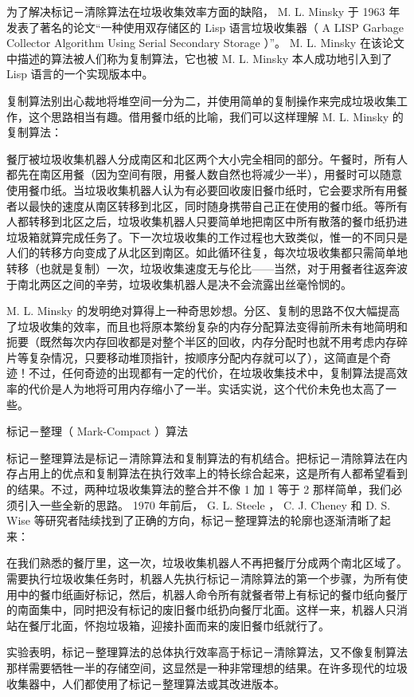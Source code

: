 \documentclass[a4paper, 11pt]{article}
\begin{document}
为了解决标记－清除算法在垃圾收集效率方面的缺陷， M. L. Minsky 于 1963 年发表了著名的论文“一种使用双存储区的 Lisp 语言垃圾收集器（ A LISP Garbage Collector Algorithm Using Serial Secondary Storage ）”。 M. L. Minsky 在该论文中描述的算法被人们称为复制算法，它也被 M. L. Minsky 本人成功地引入到了 Lisp 语言的一个实现版本中。

复制算法别出心裁地将堆空间一分为二，并使用简单的复制操作来完成垃圾收集工作，这个思路相当有趣。借用餐巾纸的比喻，我们可以这样理解 M. L. Minsky 的复制算法：

餐厅被垃圾收集机器人分成南区和北区两个大小完全相同的部分。午餐时，所有人都先在南区用餐（因为空间有限，用餐人数自然也将减少一半），用餐时可以随意使用餐巾纸。当垃圾收集机器人认为有必要回收废旧餐巾纸时，它会要求所有用餐者以最快的速度从南区转移到北区，同时随身携带自己正在使用的餐巾纸。等所有人都转移到北区之后，垃圾收集机器人只要简单地把南区中所有散落的餐巾纸扔进垃圾箱就算完成任务了。下一次垃圾收集的工作过程也大致类似，惟一的不同只是人们的转移方向变成了从北区到南区。如此循环往复，每次垃圾收集都只需简单地转移（也就是复制）一次，垃圾收集速度无与伦比——当然，对于用餐者往返奔波于南北两区之间的辛劳，垃圾收集机器人是决不会流露出丝毫怜悯的。

M. L. Minsky 的发明绝对算得上一种奇思妙想。分区、复制的思路不仅大幅提高了垃圾收集的效率，而且也将原本繁纷复杂的内存分配算法变得前所未有地简明和扼要（既然每次内存回收都是对整个半区的回收，内存分配时也就不用考虑内存碎片等复杂情况，只要移动堆顶指针，按顺序分配内存就可以了），这简直是个奇迹！不过，任何奇迹的出现都有一定的代价，在垃圾收集技术中，复制算法提高效率的代价是人为地将可用内存缩小了一半。实话实说，这个代价未免也太高了一些。

标记－整理（ Mark-Compact ）算法

标记－整理算法是标记－清除算法和复制算法的有机结合。把标记－清除算法在内存占用上的优点和复制算法在执行效率上的特长综合起来，这是所有人都希望看到的结果。不过，两种垃圾收集算法的整合并不像 1 加 1 等于 2 那样简单，我们必须引入一些全新的思路。 1970 年前后， G. L. Steele ， C. J. Cheney 和 D. S. Wise 等研究者陆续找到了正确的方向，标记－整理算法的轮廓也逐渐清晰了起来：

在我们熟悉的餐厅里，这一次，垃圾收集机器人不再把餐厅分成两个南北区域了。需要执行垃圾收集任务时，机器人先执行标记－清除算法的第一个步骤，为所有使用中的餐巾纸画好标记，然后，机器人命令所有就餐者带上有标记的餐巾纸向餐厅的南面集中，同时把没有标记的废旧餐巾纸扔向餐厅北面。这样一来，机器人只消站在餐厅北面，怀抱垃圾箱，迎接扑面而来的废旧餐巾纸就行了。

实验表明，标记－整理算法的总体执行效率高于标记－清除算法，又不像复制算法那样需要牺牲一半的存储空间，这显然是一种非常理想的结果。在许多现代的垃圾收集器中，人们都使用了标记－整理算法或其改进版本。
\end{document}
